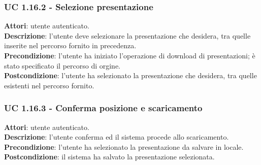 	\subsubsection{UC 1.16.2 - Selezione presentazione}{
		\label{uc1.16.2}
		\textbf{Attori}: utente autenticato. \\
		\textbf{Descrizione}: l'utente deve selezionare la presentazione che desidera, tra quelle inserite nel percorso fornito in precedenza. \\
		\textbf{Precondizione}: l'utente ha iniziato l'operazione di download di presentazioni; è stato specificato il percorso di orgine.	\\
		\textbf{Postcondizione}: l'utente ha selezionato la presentazione che desidera, tra quelle esistenti nel percorso fornito.	\\
		}
	\subsubsection{UC 1.16.3 - Conferma posizione e scaricamento}{
		\label{uc1.16.3}
		\textbf{Attori}: utente autenticato. \\
		\textbf{Descrizione}: l'utente conferma ed il sistema procede allo scaricamento. \\
		\textbf{Precondizione}: l'utente ha selezionato la presentazione da salvare in locale.	\\
		\textbf{Postcondizione}: il sistema ha salvato la presentazione selezionata.	\\
		}
